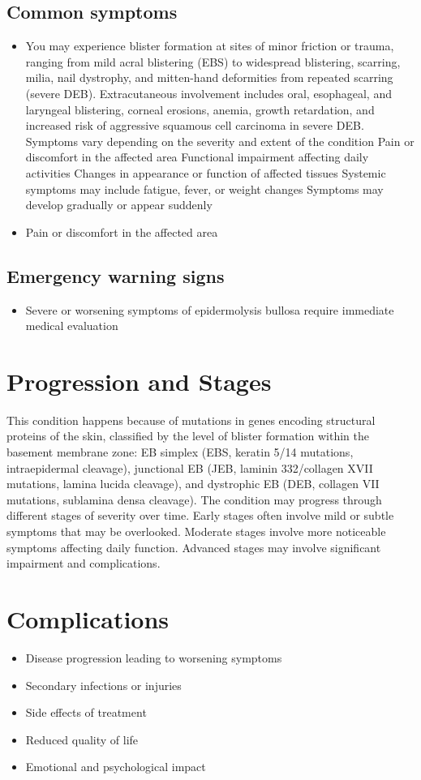 \subsection{Common symptoms}
\begin{itemize}[noitemsep]
  \item You may experience blister formation at sites of minor friction or trauma, ranging from mild acral blistering (EBS) to widespread blistering, scarring, milia, nail dystrophy, and mitten-hand deformities from repeated scarring (severe DEB). Extracutaneous involvement includes oral, esophageal, and laryngeal blistering, corneal erosions, anemia, growth retardation, and increased risk of aggressive squamous cell carcinoma in severe DEB. Symptoms vary depending on the severity and extent of the condition Pain or discomfort in the affected area Functional impairment affecting daily activities Changes in appearance or function of affected tissues Systemic symptoms may include fatigue, fever, or weight changes Symptoms may develop gradually or appear suddenly
  \item Pain or discomfort in the affected area
  \end{itemize}

\subsection{Emergency warning signs}
\begin{itemize}[noitemsep]
  \item Severe or worsening symptoms of epidermolysis bullosa require immediate medical evaluation
\end{itemize}
\section{Progression and Stages}
This condition happens because of mutations in genes encoding structural proteins of the skin, classified by the level of blister formation within the basement membrane zone: EB simplex (EBS, keratin 5/14 mutations, intraepidermal cleavage), junctional EB (JEB, laminin 332/collagen XVII mutations, lamina lucida cleavage), and dystrophic EB (DEB, collagen VII mutations, sublamina densa cleavage). The condition may progress through different stages of severity over time. Early stages often involve mild or subtle symptoms that may be overlooked. Moderate stages involve more noticeable symptoms affecting daily function. Advanced stages may involve significant impairment and complications.
\section{Complications}
\begin{itemize}[noitemsep]
  \item Disease progression leading to worsening symptoms
  \item Secondary infections or injuries
  \item Side effects of treatment
  \item Reduced quality of life
  \item Emotional and psychological impact
\end{itemize}
